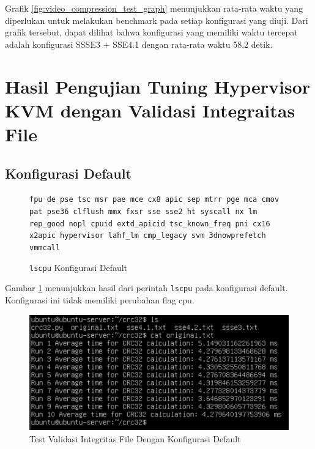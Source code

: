 Grafik \ref{fig:video_compression_test_graph} menunjukkan rata-rata waktu yang diperlukan untuk melakukan benchmark pada setiap konfigurasi yang diuji. Dari grafik tersebut, dapat dilihat bahwa konfigurasi yang memiliki waktu tercepat adalah konfigurasi SSSE3 + SSE4.1 dengan rata-rata waktu 58.2 detik.

\section{Hasil Pengujian Tuning Hypervisor KVM dengan Validasi Integraitas File}

\subsection{Konfigurasi Default}
\begin{figure}
    \texttt{fpu de pse tsc msr pae mce cx8 apic sep mtrr pge mca cmov pat pse36 clflush mmx fxsr sse sse2 ht syscall nx lm rep\_good nopl cpuid extd\_apicid tsc\_known\_freq pni cx16 x2apic hypervisor lahf\_lm cmp\_legacy svm 3dnowprefetch vmmcall}
    \caption{\texttt{lscpu} Konfigurasi Default}
    \label{fig:lscpu_file_integrity_test_default}
\end{figure}

Gambar \ref{fig:lscpu_file_integrity_test_default} menunjukkan hasil dari perintah \texttt{lscpu} pada konfigurasi default. Konfigurasi ini tidak memiliki perubahan flag cpu.

\begin{figure}
    \centering
    \includegraphics[width=1\textwidth]
    {assets/pics/crc-test/original.jpeg}
    \caption{Test Validasi Integritas File Dengan Konfigurasi Default}
    \label{fig:file_integrity_test_default}
\end{figure}

